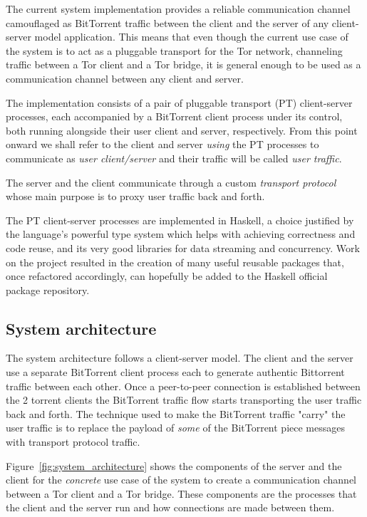 \documentclass[11pt]{article} %
\begin{document}
The current system implementation provides a reliable communication channel camouflaged as BitTorrent traffic between the client and the server of any client-server model application. This means that even though the current use case of the system is to act as a pluggable transport for the Tor network, channeling traffic between a Tor client and a Tor bridge, it is general enough to be used as a communication channel between any client and server.

The implementation consists of a pair of pluggable transport (PT) client-server processes, each accompanied by a BitTorrent client process under its control, both running alongside their user client and server, respectively. From this point onward we shall refer to the client and server \textit{using} the PT processes to communicate as \textit{user client/server} and their traffic will be called \textit{user traffic}. 

The server and the client communicate through a custom \textit{transport protocol} whose main purpose is to proxy user traffic back and forth. 

The PT client-server processes are implemented in Haskell, a choice justified by the language's powerful type system which helps with achieving correctness and code reuse, and its very good libraries for data streaming and concurrency. Work on the project resulted in the creation of many useful reusable packages that, once refactored accordingly, can hopefully be added to the Haskell official package repository.

\subsection{System architecture}

The system architecture follows a client-server model. The client and the server use a separate BitTorrent client process each to generate authentic Bittorrent traffic between each other. Once a peer-to-peer connection is established between the 2 torrent clients the BitTorrent traffic flow starts transporting the user traffic back and forth. The technique used to make the BitTorrent traffic "carry" the user traffic is to replace the payload of \textit{some} of the BitTorrent piece messages with transport protocol traffic. 


Figure~\ref{fig:system_architecture} shows the components of the server and the client for the \textit{concrete} use case of the system to create a communication channel between a Tor client and a Tor bridge. These components are the processes that the client and the server run and how connections are made between them.
\end{document}
